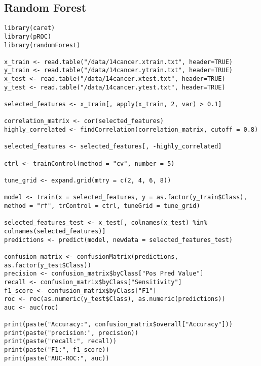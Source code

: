 \documentclass{article}
\begin{document}
\subsection{Random Forest}
\begin{lstlisting}
library(caret)
library(pROC)
library(randomForest)

x_train <- read.table("/data/14cancer.xtrain.txt", header=TRUE)
y_train <- read.table("/data/14cancer.ytrain.txt", header=TRUE)
x_test <- read.table("/data/14cancer.xtest.txt", header=TRUE)
y_test <- read.table("/data/14cancer.ytest.txt", header=TRUE)

selected_features <- x_train[, apply(x_train, 2, var) > 0.1]

correlation_matrix <- cor(selected_features)
highly_correlated <- findCorrelation(correlation_matrix, cutoff = 0.8)

selected_features <- selected_features[, -highly_correlated]

ctrl <- trainControl(method = "cv", number = 5)

tune_grid <- expand.grid(mtry = c(2, 4, 6, 8))

model <- train(x = selected_features, y = as.factor(y_train$Class), method = "rf", trControl = ctrl, tuneGrid = tune_grid)

selected_features_test <- x_test[, colnames(x_test) %in% colnames(selected_features)]
predictions <- predict(model, newdata = selected_features_test)

confusion_matrix <- confusionMatrix(predictions, as.factor(y_test$Class))
precision <- confusion_matrix$byClass["Pos Pred Value"]
recall <- confusion_matrix$byClass["Sensitivity"]
f1_score <- confusion_matrix$byClass["F1"]
roc <- roc(as.numeric(y_test$Class), as.numeric(predictions))
auc <- auc(roc)

print(paste("Accuracy:", confusion_matrix$overall["Accuracy"]))
print(paste("precision:", precision))
print(paste("recall:", recall))
print(paste("F1:", f1_score))
print(paste("AUC-ROC:", auc))
\end{lstlisting}
\newpage
\end{document}
